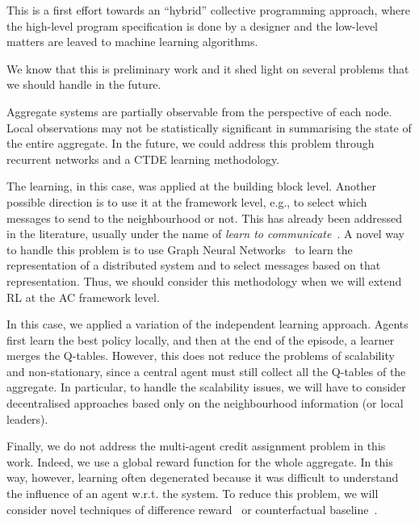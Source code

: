 \documentclass[conference]{IEEEtran}
\begin{document}
This is a first effort towards an ``hybrid'' collective programming approach, where the high-level program specification is 
 done by a designer and the low-level matters are leaved to machine learning algorithms.

We know that this is preliminary work and it shed light on several problems that we should handle in the future.

Aggregate systems are partially observable from the perspective of each node. 
 Local observations may not be statistically significant in summarising the state of the entire aggregate. 
 In the future, we could address this problem through recurrent networks and a CTDE learning methodology.
 
The learning, in this case, was applied at the building block level. 
 Another possible direction is to use it at the framework level, e.g., to select which messages to send to the neighbourhood or not. 
 This has already been addressed in the literature, usually under the name of \textit{learn to communicate}~\cite{DBLP:journals/corr/abs-1908-03963}. 
 A novel way to handle this problem is to use Graph Neural Networks~\cite{DBLP:journals/corr/abs-1812-08434} to learn the representation of a distributed system and to select messages based on that representation. 
 Thus, we should consider this methodology when we will extend RL at the AC framework level.
 
In this case, we applied a variation of the independent learning approach. 
 Agents first learn the best policy locally, and then at the end of the episode, a learner merges the Q-tables. 
 However, this does not reduce the problems of scalability and non-stationary, since a central agent must still collect all the Q-tables of the aggregate. 
 In particular, to handle the scalability issues, we will have to consider decentralised approaches based only on the neighbourhood information (or local leaders).
 
Finally, we do not address the multi-agent credit assignment problem in this work. 
 Indeed, we use a global reward function for the whole aggregate. In this way, however, learning often degenerated because it was difficult to understand the influence of an agent w.r.t. the system. 
 To reduce this problem, we will consider novel techniques of difference reward~\cite{DBLP:conf/atal/AgoginoT04} or counterfactual baseline~\cite{DBLP:journals/corr/FoersterFANW17}.



\end{document}
